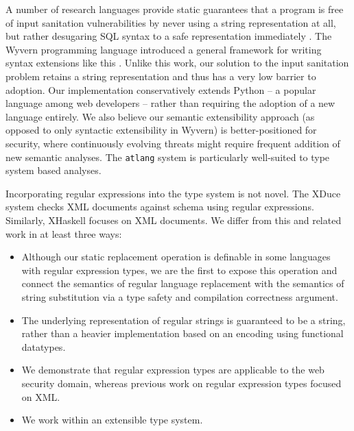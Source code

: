 \documentclass[9pt]{sig-alternate}
\theoremstyle{definition}
\begin{document}
A number of research languages provide static guarantees that a program is free of input sanitation vulnerabilities by never using a string representation at all, but rather desugaring SQL syntax to a safe representation immediately \cite{UrFlowOSDI10}. The Wyvern programming language introduced a general framework for writing syntax extensions like this \cite{tsl}.
Unlike this work, our solution to the input sanitation problem retains a string representation and thus has a very low barrier to adoption. Our implementation conservatively extends Python -- a popular language among web developers -- rather than requiring the adoption of a new language entirely.
We also believe our semantic extensibility approach (as opposed to only syntactic extensibility in Wyvern) is better-positioned for security, where continuously evolving threats might require frequent addition of new semantic  analyses. The \verb|atlang| system is particularly well-suited to type system based analyses. 


Incorporating regular expressions into the type system is not novel. The XDuce system \cite{HosoyaVouillonPierce2000ICFP} checks XML documents against schema using regular expressions. 
Similarly, XHaskell \cite{xhaskell} focuses on XML documents.
We differ from this and related work in at least three ways:
\begin{itemize}
  \item Although our static replacement operation is definable in some languages with regular expression types, we are the first to expose this operation and connect the semantics of regular language replacement with the semantics of string substitution via a type safety and compilation correctness argument.
  \item The underlying representation of regular strings is guaranteed to be a string, rather than a heavier implementation based on an encoding using functional datatypes.
  \item We demonstrate that regular expression types are applicable to the web security domain, whereas previous work on regular expression types focused on XML.
  \item We work within an extensible type system.
\end{itemize}
\end{document}
